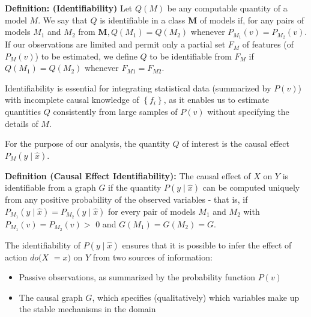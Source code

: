 \documentclass{beamer}
\begin{document}
\begin{frame}
\textbf{Definition: (Identifiability)} Let $Q(M)$ be any computable quantity of a model $M$. We say that $Q$ is identifiable in a class $\boldsymbol{M}$ of models if, for any pairs of models $M_1$ and $M_2$ from $\boldsymbol{M}, Q\left(M_1\right)=Q\left(M_2\right)$ whenever $P_{M_1}(v)=P_{M_2}(v)$. If our observations are limited and permit only a partial set $F_M$ of features (of $P_M(v)$) to be estimated, we define $Q$ to be identifiable from $F_M$ if $Q\left(M_1\right)=Q\left(M_2\right)$ whenever $F_{M 1}=F_{M 2}$.

\vspace{0.4cm}
Identifiability is essential for integrating statistical data (summarized by $P(v)$) with incomplete causal knowledge of $\left\{f_i\right\}$, as it enables us to estimate quantities $Q$ consistently from large samples of $P(v)$ without specifying the details of $M$.

\vspace{0.4cm}
For the purpose of our analysis, the quantity $Q$ of interest is the causal effect $P_M(y \mid \hat{x})$.
\end{frame}

\begin{frame}
\textbf{Definition (Causal Effect Identifiability):} The causal effect of $X$ on $Y$ is identifiable from a graph $G$ if the quantity $P(y \mid \hat{x})$ can be computed uniquely from any positive probability of the observed variables - that is, if $P_{M_1}(y \mid \hat{x})=P_{M_2}(y \mid \hat{x})$ for every pair of models $M_1$ and $M_2$ with $P_{M_1}(v)=P_{M_2}(v)>$ 0 and $G\left(M_1\right)=G\left(M_2\right)=G$.

\vspace{0.4cm}
The identifiability of $P(y \mid \hat{x})$ ensures that it is possible to infer the effect of action $d o(X$ $=x)$ on $Y$ from two sources of information:
\begin{itemize}
\item Passive observations, as summarized by the probability function $P(v)$
\item The causal graph $G$, which specifies (qualitatively) which variables make up the stable mechanisms in the domain
\end{itemize}
\end{frame}
\end{document}
